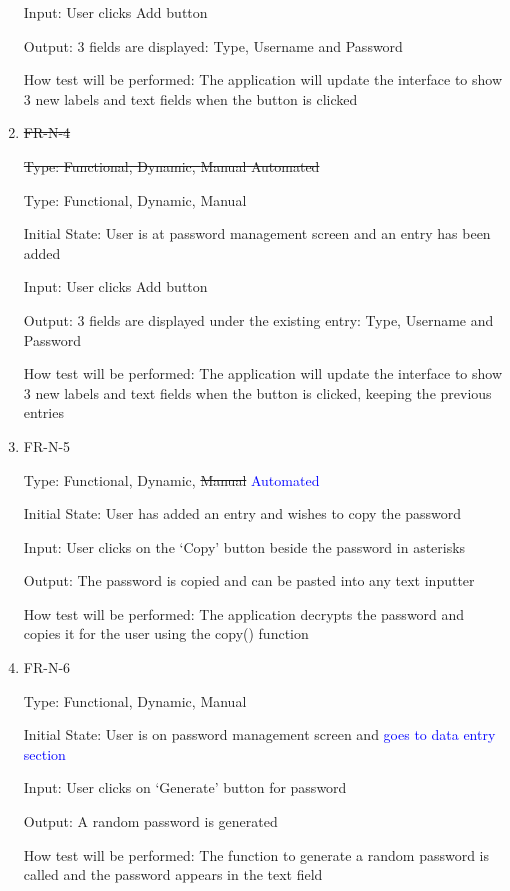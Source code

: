\documentclass[12pt, titlepage]{article}
\begin{document}
\begin{enumerate}
Input: User clicks Add button

Output: 3 fields are displayed: Type, Username and Password

How test will be performed: The application will update the interface to show 3 new labels and text fields when the button is clicked

\item{\sout{FR-N-4}\\}

\sout{Type: Functional, Dynamic, \sout{Manual} Automated}

Type: Functional, Dynamic, Manual

Initial State: User is at password management screen and an entry has been added

Input: User clicks Add button

Output: 3 fields are displayed under the existing entry: Type, Username and Password

How test will be performed: The application will update the interface to show 3 new labels and text fields when the button is clicked, keeping the previous entries

\item{FR-N-5\\}

Type: Functional, Dynamic, \sout{Manual} \textcolor{blue}{Automated}

Initial State: User has added an entry and wishes to copy the password

Input: User clicks on the ‘Copy’ button beside the password in asterisks

Output: The password is copied and can be pasted into any text inputter

How test will be performed: The application decrypts the password and copies it for the user using the copy() function

\item{FR-N-6\\}

Type: Functional, Dynamic, Manual

Initial State: User is on password management screen and \textcolor{blue}{goes to data entry section}

Input: User clicks on ‘Generate’ button for password

Output: A random password is generated

How test will be performed: The function to generate a random password is called and the password appears in the text field


\end{enumerate}
\end{document}

